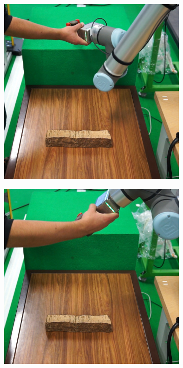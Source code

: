\begin{figure}[h]
\begin{subfigure}{.2\linewidth}
    \end{subfigure}%
    \begin{subfigure}{.2\linewidth}
        \centering
        \includegraphics[width=.95\linewidth]{figs/chp6/om_test_4.jpg}
    \end{subfigure}
    \par\smallskip
    \begin{subfigure}{.2\linewidth}
        \centering
        \includegraphics[width=.95\linewidth]{figs/chp6/om_test_5.jpg}

\end{subfigure}
\end{figure}
